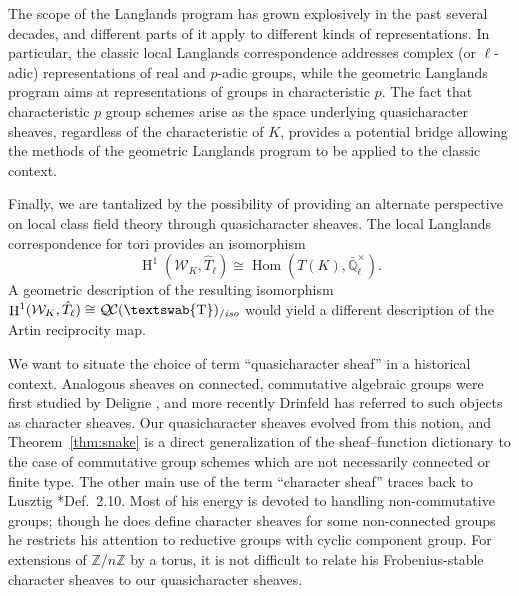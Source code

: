 \documentclass[11pt]{amsart}
\newcommand{\mathswab}[1]{\operatorname{\textswab{#1}}}
\theoremstyle{plain}
\theoremstyle{definition}
\theoremstyle{remark}
\newcommand{\ZZ}{{\mathbb{Z}}}
\newcommand{\EE}{\mathbb{\bar Q}_\ell}
\newcommand{\EEx}{\EE^\times}
\DeclareMathOperator{\Hom}{Hom}
\DeclareMathOperator{\Hh}{H}
\newcommand{\GN}[1]{\mathswab{#1}}
\newcommand{\QC}{{\mathcal{Q\hskip-0.8pt C}}}
\newcommand{\QCiso}[1]{\QC(#1)_{/\textit{iso}}}
\newcommand{\Weil}[1]{\mathcal{W}_{#1}}
\newcommand\David[1]{\marginpar{\smaller\smaller DR: #1}}
\begin{document}
The scope of the Langlands program has grown explosively in the past several decades, and
different parts of it apply to different kinds of representations.  In particular, the classic local Langlands
correspondence addresses complex (or $\ell$-adic) representations of real and $p$-adic groups, while
the geometric Langlands program aims at representations of groups in characteristic $p$.  The fact that
characteristic $p$ group schemes arise as the space underlying quasicharacter sheaves, regardless of
the characteristic of $K$, provides a potential bridge allowing the methods of the geometric Langlands
program to be applied to the classic context.

Finally, we are tantalized by the possibility of providing an alternate perspective on local class field theory
through quasicharacter sheaves.  The local Langlands correspondence for tori provides an isomorphism
\[
\Hh^1(\Weil{K}, \hat{T}_\ell) \cong \Hom(T(K), \EEx).
\]
A geometric description of the resulting isomorphism $\Hh^1(\Weil{K}, \hat{T}_\ell) \cong \QCiso{\GN{T}}$
would yield a different description of the Artin reciprocity map.

We want to situate the choice of term ``quasicharacter sheaf'' in a historical context.
Analogous sheaves on connected, commutative algebraic groups were first studied
by Deligne \cite{deligne:SGA4.5}, \David{more specific citation} and more recently Drinfeld has referred to such objects
as character sheaves.  Our quasicharacter sheaves evolved from this notion, and Theorem~\ref{thm:snake}
is a direct generalization of the sheaf--function dictionary to the case of commutative
group schemes which are not necessarily connected or finite type.  The other main use
of the term ``character sheaf'' traces back to Lusztig \cite{lusztig:85a}*{Def.~2.10}.  Most of his energy is devoted to
handling non-commutative groups; though he does define character sheaves for some
non-connected groups he restricts his attention to reductive groups with cyclic component group.
For extensions of $\ZZ/n\ZZ$ by a torus, it is not difficult to relate his Frobenius-stable character
sheaves to our quasicharacter sheaves.
\end{document}
